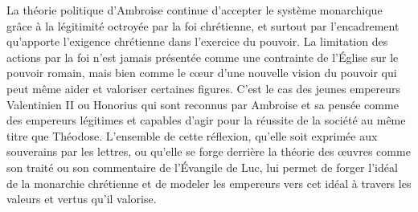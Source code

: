 \bigskip

La théorie politique d'Ambroise continue d'accepter le système monarchique grâce à la légitimité octroyée par la foi chrétienne, et surtout par l'encadrement qu'apporte l'exigence chrétienne dans l'exercice du pouvoir. La limitation des actions par la foi n'est jamais présentée comme une contrainte de l'Église sur le pouvoir romain, mais bien comme le cœur d'une nouvelle vision du pouvoir qui peut même aider et valoriser certaines figures. C'est le cas des jeunes empereurs Valentinien II ou Honorius qui sont reconnus par Ambroise et sa pensée comme des empereurs légitimes et capables d'agir pour la réussite de la société au même titre que Théodose. L'ensemble de cette réflexion, qu'elle soit exprimée aux souverains par les lettres, ou qu'elle se forge derrière la théorie des œuvres comme son traité  ou son commentaire de l'Évangile de Luc, lui permet de forger l'idéal de la monarchie chrétienne et de modeler les empereurs vers cet idéal à travers les valeurs et vertus qu'il valorise.

\bigskip
